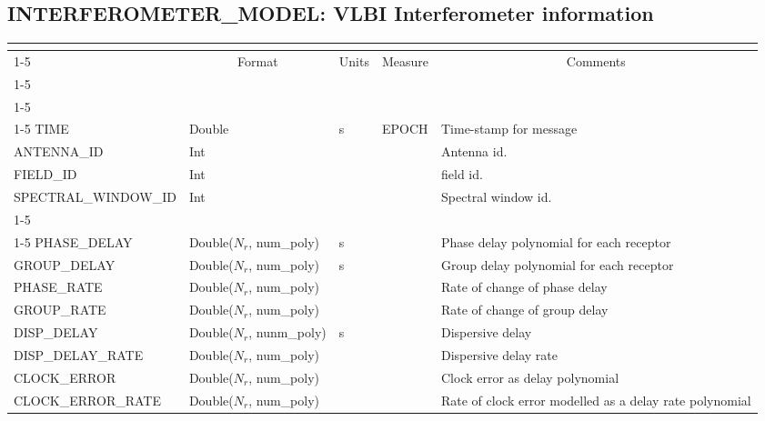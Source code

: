 \documentclass{article}
\newcommand{\nr}{$N_r$}
\newcommand{\defline}[1]{\cline{1-5}
\multicolumn{5}{|l|}{#1} \\
\cline{1-5}}
\newcommand{\definetable}[3][]
{
  \vfill\newpage
  \subsection{#2}
  \label{tbl:#1}
  \vspace{0.15in}
  \small
  \begin{tabular}{|l|p{1.25in}|l|p{.9in}|p{1.4in}|}
  \hline
  \multicolumn{5}{|c|}{\bf #1}\\
  \cline{1-5}
  \multicolumn{1}{|c|}{Name}&\multicolumn{1}{|c|}{Format}&
  \multicolumn{1}{|c|}{Units}&\multicolumn{1}{|c|}{Measure}&
  \multicolumn{1}{|c|}{Comments}\\
  \cline{1-5}
  #3
  \hline
  \end{tabular}
}
\begin{document}
\definetable{INTERFEROMETER\_MODEL: VLBI Interferometer information}{
\defline{\bf Columns}
\defline{\em Key}
TIME & Double & s &              EPOCH  & Time-stamp for message\\
ANTENNA\_ID & Int &  &  & Antenna id.\\
FIELD\_ID  & Int   &          &        & field id.\\
SPECTRAL\_WINDOW\_ID & Int & & & Spectral window id.\\
\defline{\em Data}
PHASE\_DELAY & Double(\nr, num\_poly) &  s  &      & Phase delay polynomial for each receptor\\
GROUP\_DELAY & Double(\nr, num\_poly) & s & & Group delay polynomial for each receptor\\
PHASE\_RATE  & Double(\nr, num\_poly) &  &  & Rate of change of phase delay\\
GROUP\_RATE & Double(\nr, num\_poly) &  &  & Rate of change of group delay \\
DISP\_DELAY & Double(\nr, nunm\_poly) & s &  & Dispersive delay\\
DISP\_DELAY\_RATE & Double(\nr, num\_poly) &  &  & Dispersive delay rate \\

CLOCK\_ERROR   & Double(\nr, num\_poly) &  &  & Clock error as delay polynomial\\

CLOCK\_ERROR\_RATE & Double(\nr, num\_poly) &  &  & Rate of clock error modelled as a delay rate polynomial \\

}
\end{document}
